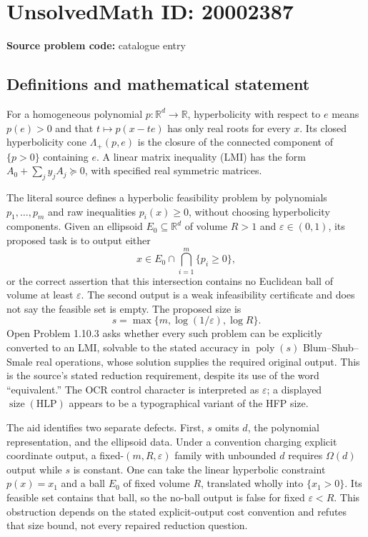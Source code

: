 \documentclass[11pt]{article}
\newcommand{\R}{\mathbb{R}}
\begin{document}
\section*{UnsolvedMath ID: 20002387}
\textbf{Source problem code:} catalogue entry
\subsection{Definitions and mathematical statement}
For a homogeneous polynomial \(p:\R^d\to\R\), hyperbolicity with respect to \(e\) means \(p(e)>0\) and that \(t\mapsto p(x-te)\) has only real roots for every \(x\). Its closed hyperbolicity cone \(\Lambda_+(p,e)\) is the closure of the connected component of \(\{p>0\}\) containing \(e\). A linear matrix inequality (LMI) has the form \(A_0+\sum_j y_jA_j\succeq0\), with specified real symmetric matrices.

The literal source defines a hyperbolic feasibility problem by polynomials \(p_1,\ldots,p_m\) and raw inequalities \(p_i(x)\ge0\), without choosing hyperbolicity components. Given an ellipsoid \(E_0\subseteq\R^d\) of volume \(R>1\) and \(\varepsilon\in(0,1)\), its proposed task is to output either
\[
 x\in E_0\cap\bigcap_{i=1}^m\{p_i\ge0\},
\]
or the correct assertion that this intersection contains no Euclidean ball of volume at least \(\varepsilon\). The second output is a weak infeasibility certificate and does not say the feasible set is empty. The proposed size is
\[
 s=\max\{m,\log(1/\varepsilon),\log R\}.
\]
Open Problem 1.10.3 asks whether every such problem can be explicitly converted to an LMI, solvable to the stated accuracy in \(\operatorname{poly}(s)\) Blum--Shub--Smale real operations, whose solution supplies the required original output. This is the source's stated reduction requirement, despite its use of the word ``equivalent.'' The OCR control character is interpreted as \(\varepsilon\); a displayed \(\operatorname{size}(\mathrm{HLP})\) appears to be a typographical variant of the HFP size.

The aid identifies two separate defects. First, \(s\) omits \(d\), the polynomial representation, and the ellipsoid data. Under a convention charging explicit coordinate output, a fixed-\((m,R,\varepsilon)\) family with unbounded \(d\) requires \(\Omega(d)\) output while \(s\) is constant. One can take the linear hyperbolic constraint \(p(x)=x_1\) and a ball \(E_0\) of fixed volume \(R\), translated wholly into \(\{x_1>0\}\). Its feasible set contains that ball, so the no-ball output is false for fixed \(\varepsilon<R\). This obstruction depends on the stated explicit-output cost convention and refutes that size bound, not every repaired reduction question.
\end{document}
